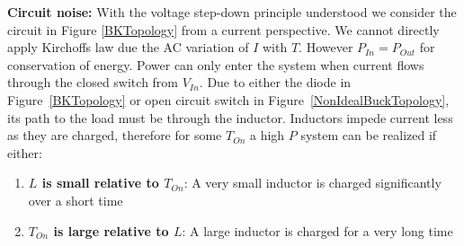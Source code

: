 \documentclass[letterpaper,twocolumn,10pt]{article}
\begin{document}
\textbf{Circuit noise: }With the voltage step-down principle understood we consider the circuit in Figure \ref{BKTopology} from a current perspective. We cannot directly apply Kirchoffs law due the AC variation of $I$ with $T$. However $P_{In} = P_{Out}$ for conservation of energy. Power can only enter the system when current flows through the closed switch from $V_{In}$. Due to either the diode in Figure~\ref{BKTopology} or open circuit switch in Figure~\ref{NonIdealBuckTopology}, its path to the load must be through the inductor. Inductors impede current less as they are charged, therefore for some $T_{On}$ a high $P$ system can be realized if either:\\
\begin{enumerate}
\item{\textbf{$L$ is small relative to $T_{On}$}: A very small inductor is charged significantly over a short time}
\item{\textbf{$T_{On}$ is large relative to $L$}: A large inductor is charged for a very long time}
\end{enumerate}
\end{document}
